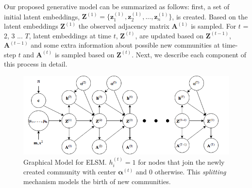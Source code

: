 \documentclass[letterpaper]{article}
\begin{document}
Our proposed generative model can be summarized as follows: first, a set of initial latent embeddings, $\mathbf{Z}^{(1)} =\{\mathbf{z}_1^{(1)}, \mathbf{z}_2^{(1)}, ..., \mathbf{z}_n^{(1)}\}$, is created. Based on the latent embeddings $\mathbf{Z}^{(1)}$ the observed adjacency matrix $\mathbf{A}^{(1)}$ is sampled. For $t$ = 2, 3 ... $T$, latent embeddings at time $t$, $\mathbf{Z}^{(t)}$, are updated based on $\mathbf{Z}^{(t-1)}$, $\mathbf{A}^{(t-1)}$ and some extra information about possible new communities at time-step $t$ and $\mathbf{A}^{(t)}$ is sampled based on $\mathbf{Z}^{(t)}$. Next, we describe each component of this process in detail.

\begin{figure}
\begin{center}
\centering
\includegraphics[width=\columnwidth]{graphical_model}
\caption{Graphical Model for ELSM. $h^{(t)}_i = 1$ for nodes that join the newly created community with center $\bm{\alpha}^{(t)}$ and $0$ otherwise. This \textit{splitting} mechanism models the birth of new communities.}
\label{fig:graphicalmodel}
\end{center}
\end{figure}
\end{document}
